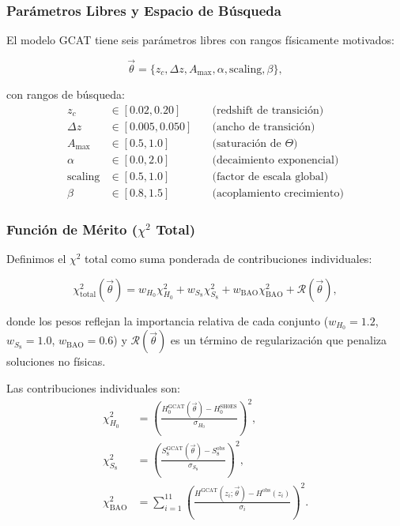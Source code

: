 \documentclass[12pt, a4paper]{article}
\theoremstyle{plain}
\theoremstyle{definition}
\begin{document}
\subsubsection{Parámetros Libres y Espacio de Búsqueda}

El modelo GCAT tiene seis parámetros libres con rangos físicamente motivados:

\begin{equation}
\vec{\theta} = \{z_c, \Delta z, A_{\max}, \alpha, \text{scaling}, \beta\},
\end{equation}

con rangos de búsqueda:
\begin{align*}
z_c &\in [0.02, 0.20] \quad &\text{(redshift de transición)} \\
\Delta z &\in [0.005, 0.050] \quad &\text{(ancho de transición)} \\
A_{\max} &\in [0.5, 1.0] \quad &\text{(saturación de $\Theta$)} \\
\alpha &\in [0.0, 2.0] \quad &\text{(decaimiento exponencial)} \\
\text{scaling} &\in [0.5, 1.0] \quad &\text{(factor de escala global)} \\
\beta &\in [0.8, 1.5] \quad &\text{(acoplamiento crecimiento)}
\end{align*}

\subsubsection{Función de Mérito ($\chi^2$ Total)}

Definimos el $\chi^2$ total como suma ponderada de contribuciones individuales:

\begin{equation}
\chi^2_{\text{total}}(\vec{\theta}) = w_{H_0}\chi^2_{H_0} + w_{S_8}\chi^2_{S_8} + w_{\text{BAO}}\chi^2_{\text{BAO}} + \mathcal{R}(\vec{\theta}),
\label{eq:chi2_total}
\end{equation}

donde los pesos reflejan la importancia relativa de cada conjunto ($w_{H_0}=1.2$, $w_{S_8}=1.0$, $w_{\text{BAO}}=0.6$) y $\mathcal{R}(\vec{\theta})$ es un término de regularización que penaliza soluciones no físicas.

Las contribuciones individuales son:
\begin{align}
\chi^2_{H_0} &= \left(\frac{H_0^{\text{GCAT}}(\vec{\theta}) - H_0^{\text{SH0ES}}}{\sigma_{H_0}}\right)^2, \\
\chi^2_{S_8} &= \left(\frac{S_8^{\text{GCAT}}(\vec{\theta}) - S_8^{\text{obs}}}{\sigma_{S_8}}\right)^2, \\
\chi^2_{\text{BAO}} &= \sum_{i=1}^{11} \left(\frac{H^{\text{GCAT}}(z_i;\vec{\theta}) - H^{\text{obs}}(z_i)}{\sigma_i}\right)^2.
\end{align}
\end{document}
